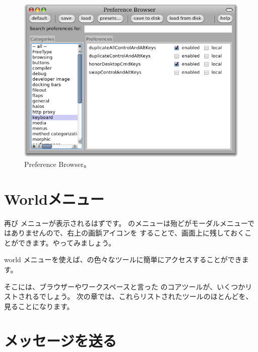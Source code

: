 \documentclass[a4paper,10pt,twoside]{book}
\begin{document}
\begin{figure}[htb]
\centerline{\includegraphics[width=\textwidth]{PreferenceBrowser}}
\caption{Preference Browser。}
\end{figure}


\section{Worldメニュー}

再び  メニューが表示されるはずです。
\pharo のメニューは殆どがモーダルメニューではありませんので、右上の画鋲アイコンを \click することで、画面上に残しておくことができます。やってみましょう。

world メニューを使えば、\pharo の色々なツールに簡単にアクセスすることができます。


そこには、ブラウザーやワークスペースと言った \pharo のコアツールが、いくつかリストされるでしょう。
次の章では、これらリストされたツールのほとんどを、見ることになります。

\section{メッセージを送る}
\end{document}
